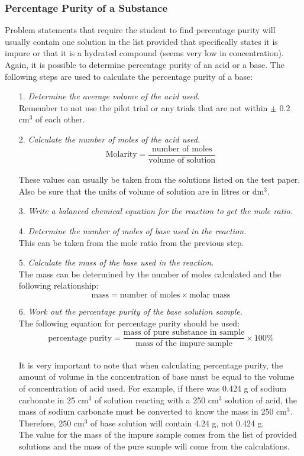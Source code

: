 \subsubsection{Percentage Purity of a Substance}

Problem statements that require the student to find percentage purity will usually contain one solution in the list provided that specifically states it is impure or that it is a hydrated compound (seems very low in concentration). Again, it is possible to determine percentage purity of an acid or a base. The following steps are used to calculate the percentage purity of a base:

\begin{enumerate}
\item[1.] \textit{Determine the average volume of the acid used.}\\
Remember to not use the pilot trial or any trials that are not within $\pm$ 0.2 cm$^3$ of each other.
\item[2.] \textit{Calculate the number of moles of the acid used.}\\
$$\text{Molarity} = \frac{\text{number of moles}}{\text{volume of solution}}$$\\
These values can usually be taken from the solutions listed on the test paper. Also be sure that the units of volume of solution are in litres or dm$^3$.
\item[3.] \textit{Write a balanced chemical equation for the reaction to get the mole ratio.}
\item[4.] \textit{Determine the number of moles of base used in the reaction.}\\
This can be taken from the mole ratio from the previous step.
\item[5.] \textit{Calculate the mass of the base used in the reaction.}\\
The mass can be determined by the number of moles calculated and the following relationship:\\
$$\text{mass} = \text{number of moles} \times \text{molar mass}$$
\item[6.] \textit{Work out the percentage purity of the base solution sample.}\\
The following equation for percentage purity should be used:\\
$$\text{percentage purity} = \frac{\text{mass of pure substance in sample}}{\text{mass of the impure sample}} \times 100\%$$\\
It is very important to note that when calculating percentage purity, the amount of volume in the concentration of base must be equal to the volume of concentration of acid used. For example, if there was 0.424 g of sodium carbonate in 25 cm$^3$ of solution reacting with a 250 cm$^3$ solution of acid, the mass of sodium carbonate must be converted to know the mass in 250 cm$^3$.  Therefore, 250 cm$^3$ of base solution will contain 4.24 g, not 0.424 g.\\
The value for the mass of the impure sample comes from the list of provided solutions and the mass of the pure sample will come from the calculations.
\end{enumerate}
